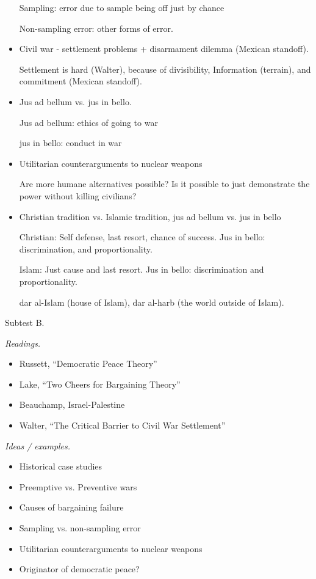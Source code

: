 \documentclass{article}
\begin{document}
\begin{itemize}
      Sampling: error due to sample being off just by chance

      Non-sampling error: other forms of error.

    \item Civil war - settlement problems + disarmament dilemma (Mexican standoff).

      Settlement is hard (Walter), because of divisibility, Information (terrain), and commitment (Mexican standoff).


    \item Jus ad bellum vs. jus in bello.

      Jus ad bellum: ethics of going to war

      jus in bello: conduct in war

    \item Utilitarian counterarguments to nuclear weapons

      Are more humane alternatives possible?  Is it possible to just demonstrate the power without killing civilians? 

    \item Christian tradition vs. Islamic tradition, jus ad bellum vs. jus in bello

      Christian: Self defense, last resort, chance of success.  Jus in bello: discrimination, and proportionality.

      Islam: Just cause and last resort.  Jus in bello: discrimination and proportionality.

      dar al-Islam (house of Islam), dar al-harb (the world outside of Islam).
  \end{itemize}

  \newpage

  Subtest B.

  {\it Readings.}

  \begin{itemize}
    \item Russett, ``Democratic Peace Theory'' 
    \item Lake, ``Two Cheers for Bargaining Theory''
    \item Beauchamp, Israel-Palestine
    \item Walter, ``The Critical Barrier to Civil War Settlement''
  \end{itemize}

  {\it Ideas / examples.}

  \begin{itemize}
    \item Historical case studies
    \item Preemptive vs. Preventive wars
    \item Causes of bargaining failure
    \item Sampling vs. non-sampling error
    \item Utilitarian counterarguments to nuclear weapons
    \item Originator of democratic peace? 
  \end{itemize}
\end{document}
